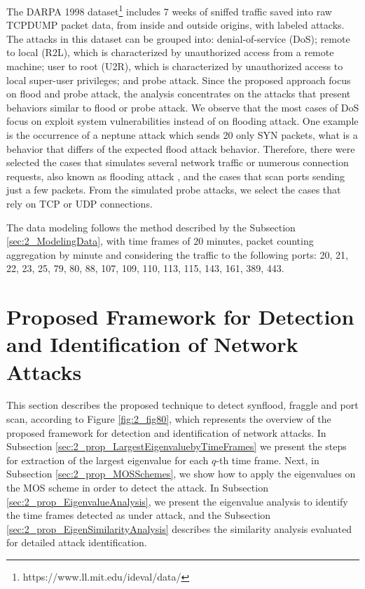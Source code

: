 The DARPA 1998 dataset\footnote{https://www.ll.mit.edu/ideval/data/} includes 7 weeks of sniffed traffic saved into raw TCPDUMP packet data, from inside and outside origins, with labeled attacks. The attacks in this dataset can be grouped into: denial-of-service (DoS); remote to local (R2L), which is characterized by unauthorized access from a remote machine; user to root (U2R), which is characterized by unauthorized access to local super-user privileges; and probe attack. Since the proposed approach focus on flood and probe attack, the analysis concentrates on the attacks that present behaviors similar to flood or probe attack. We observe that the most cases of DoS focus on exploit system vulnerabilities instead of on flooding attack. One example is the occurrence of a neptune attack which sends 20 only SYN packets, what is a behavior that differs of the expected flood attack behavior. Therefore, there were selected the cases that simulates several network traffic or numerous connection requests, also known as flooding attack \cite{ahmed2016survey,osanaiye2016distributed}, and the cases that scan ports sending just a few packets. From the simulated probe attacks, we select the cases that rely on TCP or UDP connections.

The data modeling follows the method described by the Subsection \ref{sec:2_ModelingData}, with time frames of 20 minutes, packet counting aggregation by minute and considering the traffic to the following ports: 20, 21, 22, 23, 25, 79, 80, 88, 107, 109, 110, 113, 115, 143, 161, 389, 443.


\section{Proposed Framework for Detection and Identification of Network Attacks}
\label{sec:2_prop_getv}

This section describes the proposed technique to detect synflood, fraggle and port scan, according to Figure \ref{fig:2_fig80}, which represents the overview of the proposed framework for detection and identification of network attacks. In Subsection \ref{sec:2_prop_LargestEigenvaluebyTimeFrames} we present the steps for extraction of the largest eigenvalue for each $q$-th time frame. Next, in Subsection \ref{sec:2_prop_MOSSchemes}, we show how to apply the eigenvalues on the MOS scheme in order to detect the attack. In Subsection \ref{sec:2_prop_EigenvalueAnalysis}, we present the eigenvalue analysis to identify the time frames detected as under attack, and the Subsection \ref{sec:2_prop_EigenSimilarityAnalysis} describes the similarity analysis evaluated for detailed attack identification.

